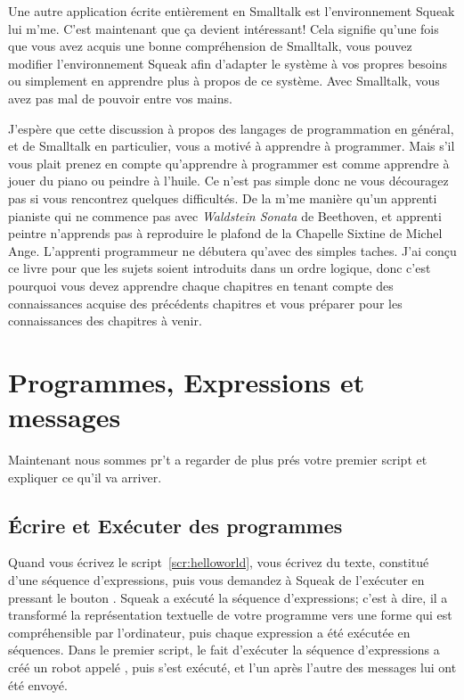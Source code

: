 \documentclass[a4paper,10pt,twoside]{book}
\begin{document}
Une autre application \'ecrite enti\`erement en Smalltalk est l'environnement Squeak lui m'me. C'est maintenant que \c ca devient int\'eressant! Cela signifie qu'une fois que vous avez acquis une bonne compr\'ehension de Smalltalk, vous pouvez modifier l'environnement Squeak afin d'adapter le syst\`eme \`a vos propres besoins ou simplement en apprendre plus \`a propos de ce syst\`eme. Avec Smalltalk, vous avez pas mal de pouvoir entre vos mains.

J'esp\`ere que cette discussion \`a propos des langages de programmation en g\'en\'eral, et de Smalltalk en particulier, vous a motiv\'e \`a apprendre \`a programmer. Mais s'il vous plait prenez en compte qu'apprendre \`a programmer est comme apprendre \`a jouer du piano ou peindre \`a l'huile. Ce n'est pas simple donc ne vous d\'ecouragez pas si vous rencontrez quelques difficult\'es. De la m'me mani\`ere qu'un apprenti pianiste qui ne commence pas avec \emph{Waldstein Sonata} de Beethoven, et apprenti peintre n'apprends pas \`a reproduire le plafond de la Chapelle Sixtine de Michel Ange. L'apprenti programmeur ne d\'ebutera qu'avec des simples taches. J'ai con\c cu ce livre pour que les sujets soient introduits dans un ordre logique, donc c'est pourquoi vous devez apprendre chaque chapitres en tenant compte des connaissances acquise des pr\'ec\'edents chapitres et vous pr\'eparer pour les connaissances des chapitres \`a venir.

\section{Programmes, Expressions et messages}

Maintenant nous sommes pr't a regarder de plus pr\'es votre premier script et expliquer ce qu'il va arriver.

\subsection{\'Ecrire et Ex\'ecuter des programmes}

Quand vous \'ecrivez le script~\ref{scr:helloworld}, vous \'ecrivez du texte, constitu\'e d'une s\'equence d'expressions, puis vous demandez \`a Squeak de l'ex\'ecuter en pressant le bouton . Squeak a ex\'ecut\'e la s\'equence d'expressions; c'est \`a dire, il a transform\'e la repr\'esentation textuelle de votre programme vers une forme qui est compr\'ehensible par l'ordinateur, puis chaque expression a \'et\'e ex\'ecut\'ee en s\'equences. Dans le premier script, le fait d'ex\'ecuter la s\'equence d'expressions a cr\'e\'e un robot appel\'e , puis  s'est ex\'ecut\'e, et l'un apr\`es l'autre des messages lui ont \'et\'e envoy\'e.
\end{document}
